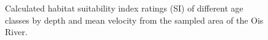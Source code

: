 \begin{figure}[!htb]
	\hfill                                                                   		%
	\hspace*{\fill}                                                                         %
	
	\caption{Calculated habitat suitability index ratings (SI) of different age classes by depth and mean velocity from the sampled area of the Ois River.}\label{fig:SI_depth}        %
\end{figure}


























